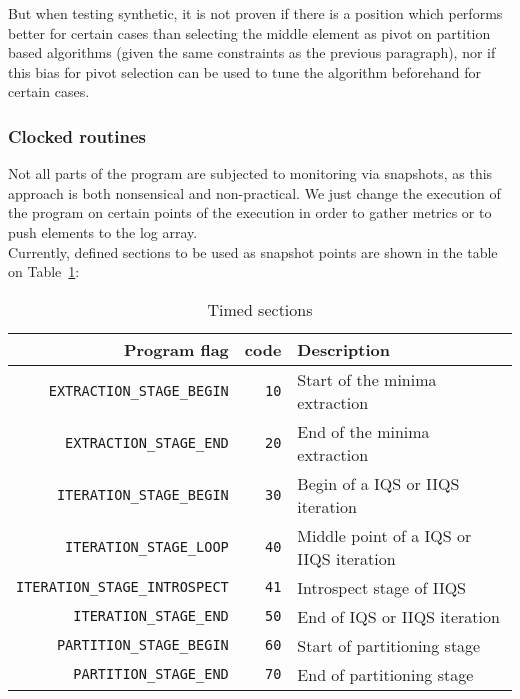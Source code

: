 But when testing synthetic, it is not proven if there is a position which performs better for certain cases than selecting the middle element as pivot on partition based algorithms (given the same constraints as the previous paragraph), nor if this bias for pivot selection can be used to tune the algorithm beforehand for certain cases.\\

\subsubsection{Clocked routines}
Not all parts of the program are subjected to monitoring via snapshots, as this approach is both nonsensical and non-practical. We just change the execution of the program on certain points of the execution in order to gather metrics or to push elements to the log array. \\

Currently, defined sections to be used as snapshot points are shown in the table on Table~\ref{TABLE:POINTS}:

\begin{table}[!ht]
    \centering
    \begin{tabularx}{\linewidth}{|r|r|X|}
        \hline
        Program flag & code & Description \\
        \hline
        \texttt{EXTRACTION\_STAGE\_BEGIN} & \texttt{10} & Start of the minima extraction\\
        \hline
        \texttt{EXTRACTION\_STAGE\_END} & \texttt{20} & End of the minima extraction \\
        \hline
        \texttt{ITERATION\_STAGE\_BEGIN} & \texttt{30} & Begin of a IQS or IIQS iteration \\
        \hline
        \texttt{ITERATION\_STAGE\_LOOP} & \texttt{40} & Middle point of a IQS or IIQS iteration \\
        \hline
        \texttt{ITERATION\_STAGE\_INTROSPECT} & \texttt{41} & Introspect stage of IIQS \\
        \hline
        \texttt{ITERATION\_STAGE\_END} & \texttt{50} & End of IQS or IIQS iteration \\
        \hline
        \texttt{PARTITION\_STAGE\_BEGIN} & \texttt{60} & Start of partitioning stage \\
        \hline
        \texttt{PARTITION\_STAGE\_END} & \texttt{70} & End of partitioning stage \\
        \hline
    \end{tabularx}
    
    \caption{Timed sections}
    \label{TABLE:POINTS}
\end{table}

\FloatBarrier
